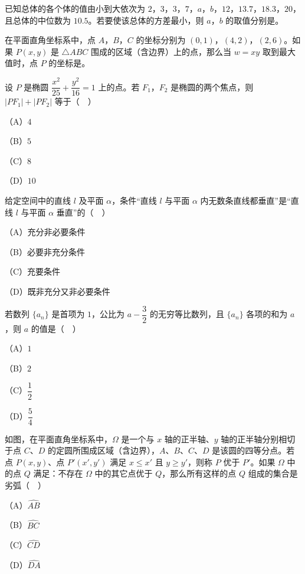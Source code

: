 \begin{question}
已知总体的各个体的值由小到大依次为 $2$，$3$，$3$，$7$，$a$，$b$，$12$，$13.7$，$18.3$，$20$，且总体的中位数为 $10.5$。若要使该总体的方差最小，则 $a$，$b$ 的取值分别是\gkblank{}。

\end{question}
\begin{question}
在平面直角坐标系中，点 $A$，$B$，$C$ 的坐标分别为 $(0,1)$，$(4,2)$，$(2,6)$。如果 $P(x,y)$ 是 $\triangle ABC$ 围成的区域（含边界）上的点，那么当 $w=xy$ 取到最大值时，点 $P$ 的坐标是\gkblank{}。

\end{question}

\begin{question}
设 $P$ 是椭圆 $\dfrac{x^2}{25}+\dfrac{y^2}{16}=1$ 上的点。若 $F_1$，$F_2$ 是椭圆的两个焦点，则 $|PF_1|+|PF_2|$ 等于（　）

（A）$4$

（B）$5$

（C）$8$

（D）$10$

\end{question}
\begin{question}
给定空间中的直线 $l$ 及平面 $\alpha$，条件“直线 $l$ 与平面 $\alpha$ 内无数条直线都垂直”是“直线 $l$ 与平面 $\alpha$ 垂直”的（　）

（A）充分非必要条件

（B）必要非充分条件

（C）充要条件

（D）既非充分又非必要条件

\end{question}
\begingroup
\renewenvironment{question}{\Needspace{0.46\textheight}}{}
\begin{question}
若数列 $\{a_n\}$ 是首项为 $1$，公比为 $a-\dfrac32$ 的无穷等比数列，且 $\{a_n\}$ 各项的和为 $a$，则 $a$ 的值是（　）

（A）$1$

（B）$2$

（C）$\dfrac12$

（D）$\dfrac54$

\Needspace{0.4\textheight}
\end{question}
\endgroup
\begin{question}
如图，在平面直角坐标系中，$\Omega$ 是一个与 $x$ 轴的正半轴、$y$ 轴的正半轴分别相切于点 $C$、$D$ 的定圆所围成区域（含边界），$A$、$B$、$C$、$D$ 是该圆的四等分点。若点 $P(x,y)$、点 $P'(x',y')$ 满足 $x\leqslant x'$ 且 $y\geqslant y'$，则称 $P$ 优于 $P'$。如果 $\Omega$ 中的点 $Q$ 满足：不存在 $\Omega$ 中的其它点优于 $Q$，那么所有这样的点 $Q$ 组成的集合是劣弧（　）
\nopagebreak[4]
\begin{center}\end{center}
\nopagebreak[4]
（A）$\widehat{AB}$

（B）$\widehat{BC}$

（C）$\widehat{CD}$

（D）$\widehat{DA}$

\end{question}

